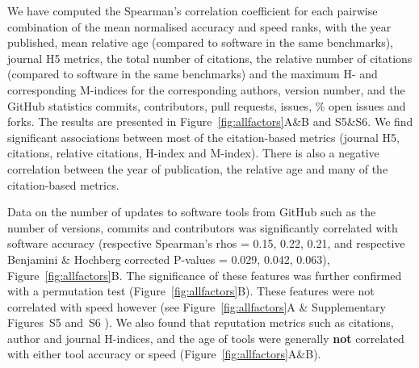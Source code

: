 \documentclass{bmcart}
\begin{document}
We have computed the Spearman’s correlation coefficient for each
pairwise combination of the mean normalised accuracy and speed ranks,
with the year published, mean relative age (compared to software in the
same benchmarks), journal H5 metrics, the total number of citations,
the relative number of citations (compared to software in the same
benchmarks) and the maximum H- and corresponding M-indices for the corresponding
authors, version number,
{\color{red}and the GitHub statistics commits, contributors, pull requests, issues, \% open issues and forks}.
The results are presented in Figure~\ref{fig:allfactors}A\&B and S5\&S6. We find
significant associations between most of the citation-based metrics
(journal H5, citations, relative citations, H-index and
M-index). There is also a negative correlation between the year of
publication, the relative age and many of the citation-based metrics.

Data on the number of updates to software tools from GitHub such as
the number of versions, commits and contributors was significantly
correlated with software accuracy (respective Spearman’s rhos =
{\color{black}0.15, 0.22, 0.21,} and respective Benjamini \& Hochberg
corrected P-values = {\color{black}0.029, 0.042, 0.063}),
Figure~\ref{fig:allfactors}B.  The significance of these features was
further confirmed with a permutation test
(Figure~\ref{fig:allfactors}B).  These features were not correlated
with speed however (see Figure~\ref{fig:allfactors}A {\color{red}\& Supplementary
Figures~S5 and~S6}%
).  We also found that
reputation metrics such as citations, author and journal H-indices,
and the age of tools were generally \textbf{not} correlated with
either tool accuracy or speed (Figure~\ref{fig:allfactors}A\&B).


\end{document}
